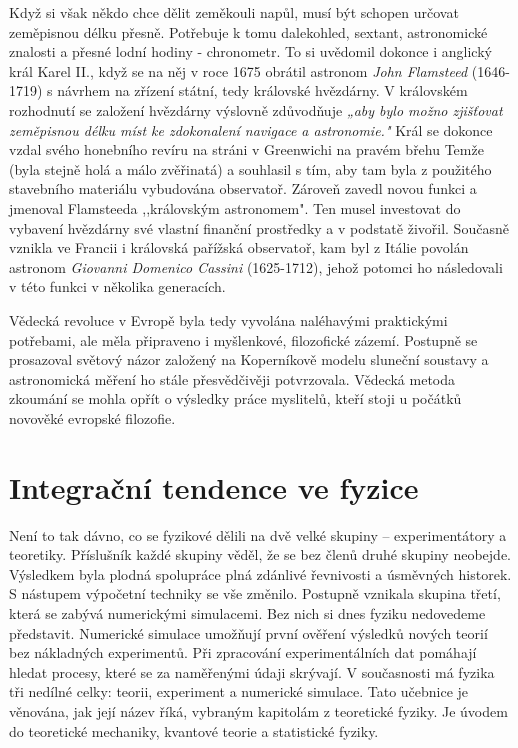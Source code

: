     Když si však někdo chce dělit zeměkouli napůl, musí být schopen určovat zeměpisnou délku přesně.
    Potřebuje k tomu dalekohled, sextant, astronomické znalosti a přesné lodní hodiny - chronometr.
    To si uvědomil dokonce i anglický král Karel II., když se na něj v roce 1675 obrátil astronom
    \emph{John Flamsteed} (1646-1719) s návrhem na zřízení státní, tedy královské hvězdárny. V
    královském rozhodnutí se založení hvězdárny výslovně zdůvodňuje \emph{„aby bylo možno zjišťovat
    zeměpisnou délku míst ke zdokonalení navigace a astronomie."} Král se dokonce vzdal svého
    honebního revíru na stráni v Greenwichi na pravém břehu Temže (byla stejně holá a málo
    zvěřinatá) a souhlasil s tím, aby tam byla z použitého stavebního materiálu vybudována
    observatoř. Zároveň zavedl novou funkci a jmenoval Flamsteeda ,,královským astronomem". Ten
    musel investovat do vybavení hvězdárny své vlastní finanční prostředky a v podstatě živořil.
    Současně vznikla ve Francii i královská pařížská observatoř, kam byl z Itálie povolán astronom
    \emph{Giovanni Domenico Cassini} (1625-1712), jehož potomci ho následovali v této funkci v
    několika generacích.

    Vědecká revoluce v Evropě byla tedy vyvolána naléhavými praktickými potřebami, ale měla
    připraveno i myšlenkové, filozofické zázemí. Postupně se prosazoval světový názor založený na
    Koperníkově modelu sluneční soustavy a astronomická měření ho stále přesvědčivěji potvrzovala.
    Vědecká metoda zkoumání se mohla opřít o výsledky práce myslitelů, kteří stoji u počátků
    novověké evropské filozofie.    

  \section{Integrační tendence ve fyzice}\label{fyz:IchapIsecVIII}
    Není to tak dávno, co se fyzikové dělili na dvě velké skupiny – experimentátory a teoretiky.
    Příslušník každé skupiny věděl, že se bez členů druhé skupiny neobejde. Výsledkem byla plodná
    spolupráce plná zdánlivé řevnivosti a úsměvných historek. S nástupem výpočetní techniky se vše
    změnilo. Postupně vznikala skupina třetí, která se zabývá numerickými simulacemi. Bez nich si
    dnes fyziku nedovedeme představit. Numerické simulace umožňují první ověření výsledků nových
    teorií bez nákladných experimentů. Při zpracování experimentálních dat pomáhají hledat procesy,
    které se za naměřenými údaji skrývají. V současnosti má fyzika tři nedílné celky: teorii,
    experiment a numerické simulace. Tato učebnice je věnována, jak její název říká, vybraným
    kapitolám z teoretické fyziky. Je úvodem do teoretické mechaniky, kvantové teorie a statistické
    fyziky. 
    
